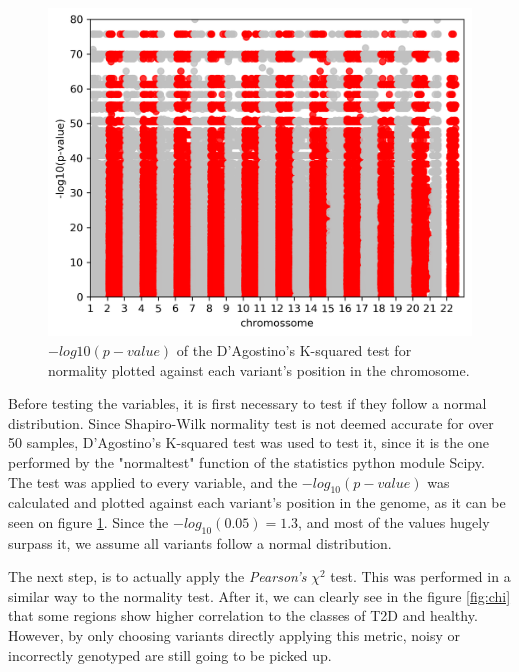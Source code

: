 \begin{figure}[h]
	\centering
	\includegraphics[width=\textwidth]{../images/feature_extraction/normality.png}
	\caption{$-log10(p-value)$ of the D'Agostino's K-squared test for normality plotted against each variant's position in the chromosome.} 
	\label{fig:normal}
\end{figure}

Before testing the variables, it is first necessary to test if they follow a normal distribution. Since Shapiro-Wilk normality test is not deemed accurate for over 50 samples, D'Agostino's K-squared test was used to test it, since it is the one performed by the "normaltest" function of the statistics python module Scipy. The test was applied to every variable, and the $-log_{10}(p-value)$ was calculated and plotted against each variant's position in the genome, as it can be seen on figure \ref{fig:normal}. Since the $-log_{10}(0.05) = 1.3$, and most of the values hugely surpass it, we assume all variants follow a normal distribution.

The next step, is to actually apply the \textit{Pearson's} $\chi^2$ test. This was performed in a similar way to the normality test. After it, we can clearly see in the figure \ref{fig:chi} that some regions show higher correlation to the classes of \gls{T2D} and healthy. However, by only choosing variants directly applying this metric, noisy or incorrectly genotyped are still going to be picked up.  

